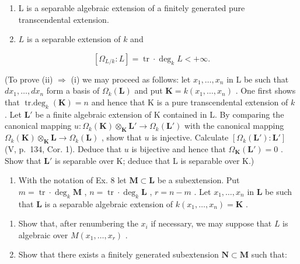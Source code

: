 \begin{enumerate}
\def\labelenumi{(\roman{enumi})}
\item
  L is a separable algebraic extension of a finitely generated pure transcendental extension.
\item
  \(L\) is a separable extension of \(k\) and
\end{enumerate}

\[
[ \Omega_ {L / k}: L ] = \operatorname{tr} \cdot \deg_ {k} L <   + \infty .
\]

(To prove (ii) \(\Rightarrow\) (i) we may proceed as follows: let \(x_{1},\ldots ,x_{n}\) in L be such that \(dx_{1},\ldots ,dx_{n}\) form a basis of \(\Omega_k(\mathbf{L})\) and put \(\mathbf{K} = k(x_1,\dots,x_n)\) . One first shows that \(\operatorname {tr.deg}_k(\mathbf{K}) = n\) and hence that K is a pure transcendental extension of \(k\) . Let \(\mathbf{L}'\) be a finite algebraic extension of K contained in L. By comparing the canonical mapping \(u:\Omega_k(\mathbf{K})\otimes_\mathbf{K}\mathbf{L}'\to \Omega_k(\mathbf{L}')\) with the canonical mapping \(\Omega_k(\mathbf{K})\otimes_\mathbf{K}\mathbf{L}\to \Omega_k(\mathbf{L})\) , show that \(u\) is injective. Calculate \([\Omega_k(\mathbf{L}'):\mathbf{L}']\) (V, p.~134, Cor. 1). Deduce that \(u\) is bijective and hence that \(\Omega_{\mathbf{K}}(\mathbf{L}') = 0\) . Show that \(\mathbf{L}'\) is separable over K; deduce that L is separable over K.)

\begin{enumerate}
\def\labelenumi{\arabic{enumi})}
\setcounter{enumi}{8}
\tightlist
\item
  With the notation of Ex. 8 let \(\mathbf{M} \subset \mathbf{L}\) be a subextension. Put \(m = \operatorname{tr} \cdot \deg_k \mathbf{M}\) , \(n = \operatorname{tr} \cdot \deg_k \mathbf{L}\) , \(r = n - m\) . Let \(x_1, \ldots, x_n\) in \(\mathbf{L}\) be such that \(\mathbf{L}\) is a separable algebraic extension of \(k(x_1, \ldots, x_n) = \mathbf{K}\) .
\end{enumerate}

\begin{enumerate}
\def\labelenumi{\alph{enumi})}
\item
  Show that, after renumbering the \(x_{i}\) if necessary, we may suppose that \(L\) is algebraic over \(M(x_{1},\ldots ,x_{r})\) .
\item
  Show that there exists a finitely generated subextension \(\mathbf{N} \subset \mathbf{M}\) such that:
\end{enumerate}

